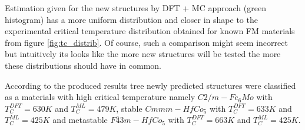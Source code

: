 Estimation given for the new structures by DFT + MC approach (green histogram) has a more uniform distribution and closer in shape to the experimental critical temperature distribution obtained for known FM materials from figure \ref{fig:tc_distrib}. Of course, such a comparison might seem incorrect but intuitively its looks like the more new structures will be tested the more these distributions should have in common.

According to the produced results tree newly predicted structures were classified as a materials with high critical temperature namely $C2/m - Fe_6Mo$   with $T_C^{DFT} = 630 K$ and $T_C^{ML} = 479 K$,  stable $Cmmm - HfCo_5$ with $T_C^{DFT} = 633 K$ and $T_C^{ML} = 425 K$ and metastable $F\bar{4}3m - HfCo_5$ with $T_C^{DFT} = 663 K$ and $T_C^{ML} = 425 K$.


